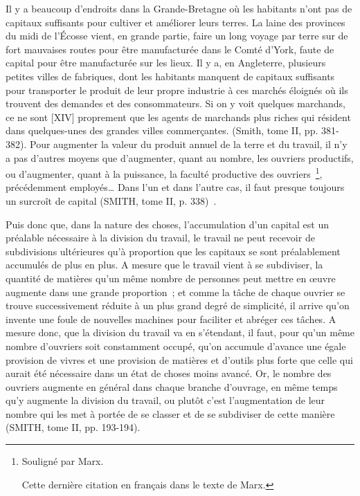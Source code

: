 \documentclass[french,twoside]{book} %
\newenvironment{quoteblock}%
  {\begin{quoting}}
  {\end{quoting}}
\newenvironment{quotebar}{%
    \def\FrameCommand{{\color{rubric!10!}\vrule width 0.5em} \hspace{0.9em}}%
    \def\OuterFrameSep{\itemsep} %
    \MakeFramed {\advance\hsize-\width \FrameRestore}
  }%
  {%
    \endMakeFramed
  }
\renewenvironment{quoteblock}%
  {%
    \savenotes
    \setstretch{0.9}
    \normalfont
    \begin{quotebar}
  }
  {%
    \end{quotebar}
    \spewnotes
  }
\begin{document}
\begin{quoteblock}
 Il y a beaucoup d’endroits dans la Grande-Bretagne où les habitants n’ont pas de capitaux suffisants pour cultiver et améliorer leurs terres. La laine des provinces du midi de l’Écosse vient, en grande partie, faire un long voyage par terre sur de fort mauvaises routes pour être manufacturée dans le Comté d’York, faute de capital pour être manufacturée sur les lieux. Il y a, en Angleterre, plusieurs petites villes de fabriques, dont les habitants manquent de capitaux suffisants pour transporter le produit de leur propre industrie à ces marchés éloignés où ils trouvent des demandes et des consommateurs. Si on y voit quelques marchands, ce ne sont [XIV] proprement que les agents de marchands plus riches qui résident dans quelques-unes des grandes villes commerçantes. (Smith, tome II, pp. 381-382). Pour augmenter la valeur du produit annuel de la terre et du travail, il n’y a pas d’autres moyens que d’augmenter, quant au nombre, les ouvriers productifs, ou d’augmenter, quant à la puissance, la faculté productive des ouvriers \footnote{ \noindent Souligné par Marx.\par
 Cette dernière citation en français dans le texte de Marx.
}, précédemment employés… Dans l’un et dans l’autre cas, il faut presque toujours un surcroît de capital (SMITH, tome II, p. 338) .\par
 Puis donc que, dans la nature des choses, l’accumulation d’un capital est un préalable nécessaire à la division du travail, le travail ne peut recevoir de subdivisions ultérieures qu’à proportion que les capitaux se sont préalablement accumulés de plus en plus. A mesure que le travail vient à se subdiviser, la quantité de matières qu’un même nombre de personnes peut mettre en œuvre augmente dans une grande proportion ; et comme la tâche de chaque ouvrier se trouve successivement réduite à un plus grand degré de simplicité, il arrive qu’on invente une foule de nouvelles machines pour faciliter et abréger ces tâches. A mesure donc, que la division du travail va en s’étendant, il faut, pour qu’un même nombre d’ouvriers soit constamment occupé, qu’on accumule d’avance une égale provision de vivres et une provision de matières et d’outils plus forte que celle qui aurait été nécessaire dans un état de choses moins avancé. Or, le nombre des ouvriers augmente en général dans chaque branche d’ouvrage, en même temps qu’y augmente la division du travail, ou plutôt c’est l’augmentation de leur nombre qui les met à portée de se classer et de se subdiviser de cette manière (SMITH, tome II, pp. 193-194).\par

\end{quoteblock}
\end{document}
